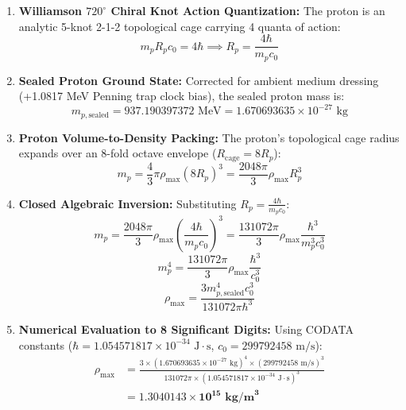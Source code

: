 \documentclass[11pt,a4paper]{article}
\begin{document}
\begin{enumerate}
    \item \textbf{Williamson $720^\circ$ Chiral Knot Action Quantization:}  
    The proton is an analytic 5-knot 2-1-2 topological cage carrying 4 quanta of action:
    \begin{equation}
    m_p R_p c_0 = 4\hbar \implies R_p = \frac{4\hbar}{m_p c_0}
    \label{eq:rp_action}
    \end{equation}

    \item \textbf{Sealed Proton Ground State:}  
    Corrected for ambient medium dressing (+1.0817 MeV Penning trap clock bias), the sealed proton mass is:
    \begin{equation}
    m_{p,\text{sealed}} = 937.190397372\text{ MeV} = 1.670693635 \times 10^{-27}\text{ kg}
    \end{equation}

    \item \textbf{Proton Volume-to-Density Packing:}  
    The proton's topological cage radius expands over an 8-fold octave envelope ($R_{\text{cage}} = 8 R_p$):
    \begin{equation}
    m_p = \frac{4}{3}\pi \rho_{\max} (8 R_p)^3 = \frac{2048\pi}{3} \rho_{\max} R_p^3
    \end{equation}

    \item \textbf{Closed Algebraic Inversion:}  
    Substituting $R_p = \frac{4\hbar}{m_p c_0}$:
    \begin{equation}
    m_p = \frac{2048\pi}{3} \rho_{\max} \left(\frac{4\hbar}{m_p c_0}\right)^3 = \frac{131072\pi}{3} \rho_{\max} \frac{\hbar^3}{m_p^3 c_0^3}
    \end{equation}
    \begin{equation}
    m_p^4 = \frac{131072\pi}{3} \rho_{\max} \frac{\hbar^3}{c_0^3}
    \end{equation}
    \begin{equation}
    \rho_{\max} = \frac{3 m_{p,\text{sealed}}^4 c_0^3}{131072\pi \hbar^3}
    \label{eq:rho_max_closed_form}
    \end{equation}

    \item \textbf{Numerical Evaluation to 8 Significant Digits:}  
    Using CODATA constants ($\hbar = 1.054571817 \times 10^{-34}\text{ J}\cdot\text{s}$, $c_0 = 299792458\text{ m/s}$):
    \begin{equation}
    \begin{aligned} \rho_{\max} &= \frac{3 \times (1.670693635 \times 10^{-27}\text{ kg})^4 \times (299792458\text{ m/s})^3}{131072\pi \times (1.054571817 \times 10^{-34}\text{ J}\cdot\text{s})^3} \\ &= \mathbf{1.3040143 \times 10^{15}\text{ kg/m}^3} \end{aligned}
    \label{eq:rho_max_8digits}
    \end{equation}
\end{enumerate}
\end{document}
